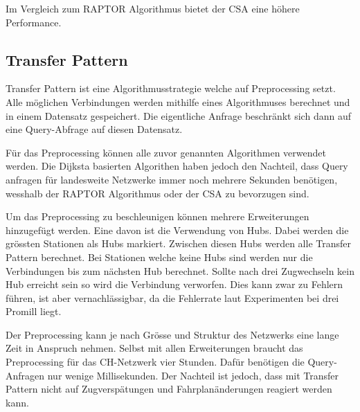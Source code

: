 Im Vergleich zum RAPTOR Algorithmus bietet der CSA eine höhere Performance.


\subsection{Transfer Pattern}
\label{sec:Transfer Pattern}
Transfer Pattern ist eine Algorithmusstrategie welche auf Preprocessing setzt. Alle möglichen Verbindungen werden mithilfe eines Algorithmuses berechnet und in einem Datensatz gespeichert. Die eigentliche Anfrage beschränkt sich dann auf eine Query-Abfrage auf diesen Datensatz.

Für das Preprocessing können alle zuvor genannten Algorithmen verwendet werden. Die Dijksta basierten Algorithen haben jedoch den Nachteil, dass Query anfragen für landesweite Netzwerke immer noch mehrere Sekunden benötigen, wesshalb der RAPTOR Algorithmus oder der CSA zu bevorzugen sind.

Um das Preprocessing zu beschleunigen können mehrere Erweiterungen hinzugefügt werden. Eine davon ist die Verwendung von Hubs. Dabei werden die grössten Stationen als Hubs markiert. Zwischen diesen Hubs werden alle Transfer Pattern berechnet. Bei Stationen welche keine Hubs sind werden nur die Verbindungen bis zum nächsten Hub berechnet. Sollte nach drei Zugwechseln kein Hub erreicht sein so wird die Verbindung verworfen. Dies kann zwar zu Fehlern führen, ist aber vernachlässigbar, da die Fehlerrate laut Experimenten bei drei Promill liegt.

Der Preprocessing kann je nach Grösse und Struktur des Netzwerks eine lange Zeit in Anspruch nehmen. Selbst mit allen Erweiterungen braucht das Preprocessing für das CH-Netzwerk vier Stunden. Dafür benötigen die Query-Anfragen nur wenige Millisekunden. Der Nachteil ist jedoch, dass mit Transfer Pattern nicht auf Zugverspätungen und Fahrplanänderungen reagiert werden kann. 





